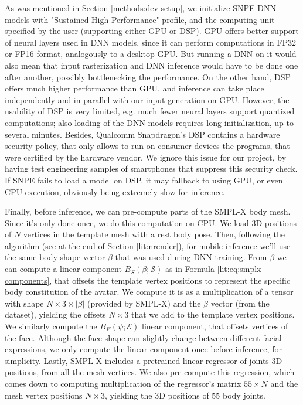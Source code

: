 As was mentioned in Section \ref{methods:dev-setup}, we initialize SNPE DNN models with "Sustained High Performance" profile, and the computing unit specified by the user (supporting either GPU or DSP). GPU offers better support of neural layers used in DNN models, since it can perform computations in FP32 or FP16 format, analogously to a desktop GPU. But running a DNN on it would also mean that input rasterization and DNN inference would have to be done one after another, possibly bottlenecking the performance. On the other hand, DSP offers much higher performance than GPU, and inference can take place independently and in parallel with our input generation on GPU. However, the usability of DSP is very limited, e.g. much fewer neural layers support quantized computations; also loading of the DNN models requires long initialization, up to several minutes. Besides, Qualcomm Snapdragon's DSP contains a hardware security policy, that only allows to run on consumer devices the programs, that were certified by the hardware vendor. We ignore this issue for our project, by having test engineering samples of smartphones that suppress this security check. If SNPE fails to load a model on DSP, it may fallback to using GPU, or even CPU execution, obviously being extremely slow for inference.

Finally, before inference, we can pre-compute parts of the SMPL-X \cite{dnn:smplx19} body mesh. Since it's only done once, we do this computation on CPU. We load 3D positions of $N$ vertices in the template mesh with a rest body pose. Then, following the algorithm (see at the end of Section \ref{lit:nrender}), for mobile inference we'll use the same body shape vector $\beta$ that was used during DNN training. From $\beta$ we can compute a linear component $B_S(\beta; \mathcal{S})$ as in Formula \ref{lit:eq:smplx-components}, that offsets the template vertex positions to represent the specific body constitution of the avatar. We compute it is as a multiplication of a tensor with shape $N \times 3 \times \lvert\beta\rvert$ (provided by SMPL-X) and the $\beta$ vector (from the dataset), yielding the offsets $N \times 3$ that we add to the template vertex positions. We similarly compute the $B_E(\psi; \mathcal{E})$ linear component, that offsets vertices of the face. Although the face shape can slightly change between different facial expressions, we only compute the linear component once before inference, for simplicity. Lastly, SMPL-X includes a pretrained linear regressor of joints 3D positions, from all the mesh vertices. We also pre-compute this regression, which comes down to computing multiplication of the regressor's matrix $55 \times N$ and the mesh vertex positions $N \times 3$, yielding the 3D positions of 55 body joints. 


